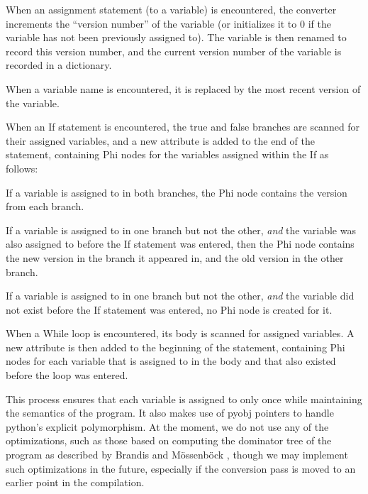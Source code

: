 \documentclass[11pt,twocolumn]{article}
\newenvironment{packed_enum}{
\begin{enumerate}
  \setlength{\itemsep}{1pt}
  \setlength{\parskip}{0pt}
  \setlength{\parsep}{0pt}
}{\end{enumerate}}
\begin{document}
\begin{packed_enum}
\item When an assignment statement (to a variable) is encountered, the
  converter increments the ``version number'' of the variable (or
  initializes it to $0$ if the variable has not been previously
  assigned to). The variable is then renamed to record this version
  number, and the current version number of the variable is recorded
  in a dictionary.
\item When a variable name is encountered, it is replaced by the most
  recent version of the variable.
\item When an If statement is encountered, the true and false branches
  are scanned for their assigned variables, and a new attribute is
  added to the end of the statement, containing Phi nodes for the
  variables assigned within the If as follows:
  \begin{packed_enum}
  \item If a variable is assigned to in both branches, the Phi node
    contains the version from each branch.
  \item If a variable is assigned to in one branch but not the other,
    \textit{and} the variable was also assigned to before the If
    statement was entered, then the Phi node contains the new version
    in the branch it appeared in, and the old version in the other
    branch.
  \item If a variable is assigned to in one branch but not the other,
    \textit{and} the variable did not exist before the If
    statement was entered, no Phi node is created for it.
  \end{packed_enum}
\item When a While loop is encountered, its body is scanned for
  assigned variables. A new attribute is then added to the beginning
  of the statement, containing Phi nodes for each variable that is
  assigned to in the body and that also existed before the loop was
  entered.
\end{packed_enum}

This process ensures that each variable is assigned to only once while
maintaining the semantics of the program. It also makes use of pyobj
pointers to handle python's explicit polymorphism. At the moment, we do not use
any of the optimizations, such as those based on computing the
dominator tree of the program as described by Brandis and
M\"{o}ssenb\"{ock} \cite{brandis-mossenbock}, though we may implement such
optimizations in the future, especially if the conversion pass is
moved to an earlier point in the compilation.
\end{document}
